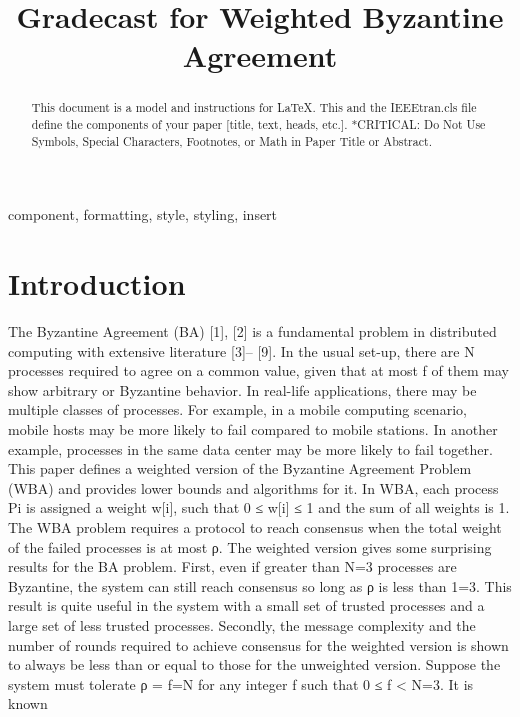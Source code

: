 \documentclass[conference]{IEEEtran}
\begin{document}
\title{Gradecast for Weighted Byzantine Agreement\\
}

\author{
\and
{}
}

\maketitle

\begin{abstract}
This document is a model and instructions for \LaTeX.
This and the IEEEtran.cls file define the components of your paper [title, text, heads, etc.]. *CRITICAL: Do Not Use Symbols, Special Characters, Footnotes, 
or Math in Paper Title or Abstract.
\end{abstract}

\begin{IEEEkeywords}
component, formatting, style, styling, insert
\end{IEEEkeywords}

\section{Introduction}
The Byzantine Agreement (BA) [1], [2] is a fundamental
problem in distributed computing with extensive literature [3]–
[9]. In the usual set-up, there are N processes required to agree
on a common value, given that at most f of them may show
arbitrary or Byzantine behavior. In real-life applications, there
may be multiple classes of processes. For example, in a mobile
computing scenario, mobile hosts may be more likely to fail
compared to mobile stations. In another example, processes in
the same data center may be more likely to fail together. This
paper defines a weighted version of the Byzantine Agreement
Problem (WBA) and provides lower bounds and algorithms
for it. In WBA, each process Pi is assigned a weight w[i],
such that 0 ≤ w[i] ≤ 1 and the sum of all weights is 1.
The WBA problem requires a protocol to reach consensus
when the total weight of the failed processes is at most ρ.
The weighted version gives some surprising results for the
BA problem. First, even if greater than N=3 processes are
Byzantine, the system can still reach consensus so long as ρ
is less than 1=3. This result is quite useful in the system with
a small set of trusted processes and a large set of less trusted
processes.
Secondly, the message complexity and the number of rounds
required to achieve consensus for the weighted version is
shown to always be less than or equal to those for the unweighted version. Suppose the system must tolerate ρ = f=N
for any integer f such that 0 ≤ f < N=3. It is known 
\end{document}
